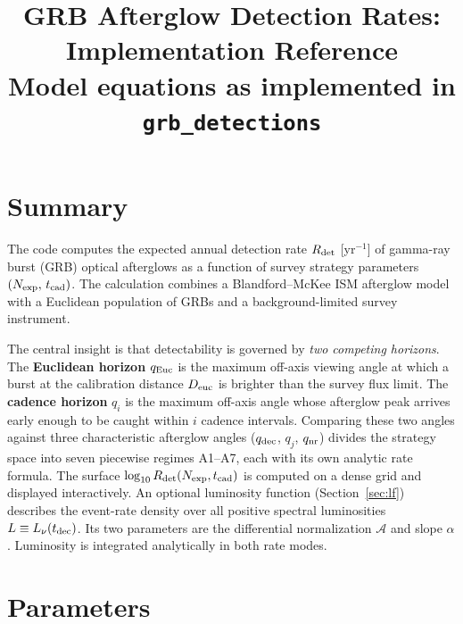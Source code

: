 \documentclass[11pt,a4paper]{article}
\title{\textbf{GRB Afterglow Detection Rates: Implementation Reference}\\
\large Model equations as implemented in \texttt{grb\_detections}}
\author{}
\date{}
\begin{document}
\maketitle
\thispagestyle{empty}

\section*{Summary}

The code computes the expected annual detection rate $R_{\rm det}$ [yr$^{-1}$] of gamma-ray burst (GRB) optical afterglows as a function of survey strategy parameters $(N_{\rm exp},\,t_{\rm cad})$.
The calculation combines a Blandford--McKee ISM afterglow model with a Euclidean population of GRBs and a background-limited survey instrument.

The central insight is that detectability is governed by \emph{two competing horizons}.
The \textbf{Euclidean horizon} $q_{\rm Euc}$ is the maximum off-axis viewing angle at which a burst at the calibration distance $D_{\rm euc}$ is brighter than the survey flux limit.
The \textbf{cadence horizon} $q_i$ is the maximum off-axis angle whose afterglow peak arrives early enough to be caught within $i$ cadence intervals.
Comparing these two angles against three characteristic afterglow angles ($q_{\rm dec}$, $q_j$, $q_{\rm nr}$) divides the strategy space into seven piecewise regimes A1--A7, each with its own analytic rate formula.
The surface $\log_{10}R_{\rm det}(N_{\rm exp},t_{\rm cad})$ is computed on a dense grid and displayed interactively.
An optional luminosity function (Section~\ref{sec:lf}) describes the event-rate density over all positive spectral luminosities $L\equiv L_\nu(t_{\rm dec})$. Its two parameters are the differential normalization $\mathcal A$ and slope $\alpha$. Luminosity is integrated analytically in both rate modes.

\section{Parameters}
\end{document}
